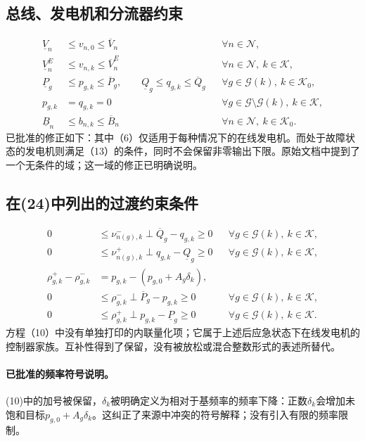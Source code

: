 \documentclass{article}
\begin{document}
\subsection*{总线、发电机和分流器约束}
\begin{align}
\underline V_n&\leq v_{n,0}\leq\overline V_n
&&\forall n\in\mathcal N,\tag{4}\\
\underline V_n^E&\leq v_{n,k}\leq\overline V_n^E
&&\forall n\in\mathcal N,\ k\in\mathcal K,\tag{5}\\
\underline P_g&\leq p_{g,k}\leq\overline P_g,\qquad
\underline Q_g\leq q_{g,k}\leq\overline Q_g
&&\forall g\in\mathcal G(k),\ k\in\mathcal K_0,\tag{6}\\
p_{g,k}&=q_{g,k}=0
&&\forall g\in\mathcal G\setminus\mathcal G(k),\ k\in\mathcal K,\tag{13}\\
\underline B_n&\leq b_{n,k}\leq\overline B_n
&&\forall n\in\mathcal N,\ k\in\mathcal K_0.\tag{14}
\end{align}
已批准的修正如下：其中（6）仅适用于每种情况下的在线发电机。而处于故障状态的发电机则满足（13）的条件，同时不会保留非零输出下限。原始文档中提到了一个无条件的域；这一域的修正已明确说明。

\subsection*{在(24)中列出的过渡约束条件}
\begin{align}
0&\leq\nu_{n(g),k}^{-}\perp\overline Q_g-q_{g,k}\geq0
&&\forall g\in\mathcal G(k),\ k\in\mathcal K,\tag{8}\\
0&\leq\nu_{n(g),k}^{+}\perp q_{g,k}-\underline Q_g\geq0
&&\forall g\in\mathcal G(k),\ k\in\mathcal K,\tag{9}\\
\rho_{g,k}^{+}-\rho_{g,k}^{-}
&=p_{g,k}-(p_{g,0}+A_g\delta_k),\tag{10}\\
0&\leq\rho_{g,k}^{-}\perp\overline P_g-p_{g,k}\geq0
&&\forall g\in\mathcal G(k),\ k\in\mathcal K,\tag{11}\\
0&\leq\rho_{g,k}^{+}\perp p_{g,k}-\underline P_g\geq0
&&\forall g\in\mathcal G(k),\ k\in\mathcal K.\tag{12}
\end{align}
方程（10）中没有单独打印的内联量化项；它属于上述后应急状态下在线发电机的控制器家族。互补性得到了保留，没有被放松或混合整数形式的表述所替代。

\paragraph{已批准的频率符号说明。}
(10)中的加号被保留，$\delta_k$被明确定义为相对于基频率的频率下降：正数$\delta_k$会增加未饱和目标$p_{g,0}+A_g\delta_k$。这纠正了来源中冲突的符号解释；没有引入有限的频率限制。
\end{document}
